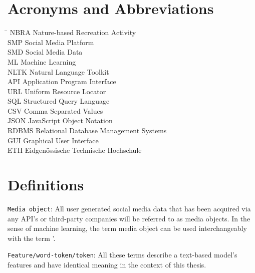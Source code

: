
\section*{Acronyms and Abbreviations}
\begin{tabbing}
 \hspace*{1.6cm}  \= \kill
 NBRA \> Nature-based Recreation Activity \\[0.5ex]
 SMP \> Social Media Platform \\
 SMD \> Social Media Data \\
 ML \> Machine Learning \\
 NLTK \> Natural Language Toolkit \\
 API \> Application Program Interface \\
 URL \> Uniform Resource Locator \\
 SQL \> Structured Query Language \\
 CSV \> Comma Separated Values \\
 JSON \> JavaScript Object Notation \\
 RDBMS \> Relational Database Management Systems \\
 GUI \> Graphical User Interface \\
 ETH \> Eidgen\"{o}ssische Technische Hochschule
\end{tabbing}

\section*{Definitions}
\texttt{Media object}: All user generated social media data that has been acquired via any API\rq s or third-party companies will be referred to as media objects. In the sense of machine learning, the term media object can be used interchangeably with the term \lqdocument\rq.\newline

\texttt{Feature/word-token/token}: All these terms describe a text-based model\rq s features and have identical meaning in the context of this thesis.\newline

